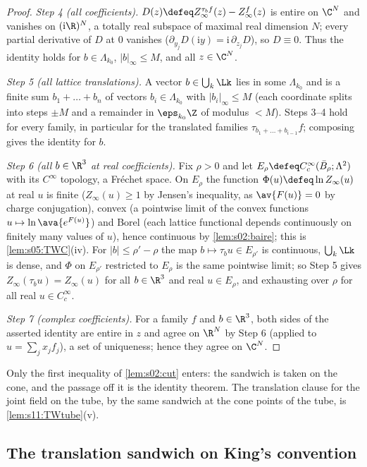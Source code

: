 \begin{proof}
\emph{Step 4 (all coefficients).} $D(z)\defeq Z^{\tau_bf}_\infty(z)-Z^f_\infty(z)$ is entire on $\C^N$ and vanishes on $(\mathrm i\R)^N$, a totally real subspace of maximal real dimension $N$; every partial derivative of $D$ at $0$ vanishes ($\partial_{y_j}D(\mathrm iy)=\mathrm i\,\partial_{z_j}D$), so $D\equiv0$. Thus the identity holds for $b\in\Lambda_{k_0}$, $|b|_\infty\le M$, and all $z\in\C^N$.

\emph{Step 5 (all lattice translations).} A vector $b\in\bigcup_k\Lk$ lies in some $\Lambda_{k_0}$ and is a finite sum $b_1+\dots+b_n$ of vectors $b_i\in\Lambda_{k_0}$ with $|b_i|_\infty\le M$ (each coordinate splits into steps $\pm M$ and a remainder in $\eps_{k_0}\Z$ of modulus $<M$). Steps 3--4 hold for every family, in particular for the translated families $\tau_{b_1+\dots+b_{i-1}}f$; composing gives the identity for $b$.

\emph{Step 6 (all $b\in\R^3$ at real coefficients).} Fix $\rho>0$ and let $E_\rho\defeq C^\infty_c(\bar B_\rho;\Lambda^2)$ with its $C^\infty$ topology, a Fr\'echet space. On $E_\rho$ the function $\Phi(u)\defeq\ln Z_\infty(u)$ at real $u$ is finite ($Z_\infty(u)\ge1$ by Jensen's inequality, as $\av{F(u)}=0$ by charge conjugation), convex (a pointwise limit of the convex functions $u\mapsto\ln\ava{e^{F(u)}}$) and Borel (each lattice functional depends continuously on finitely many values of $u$), hence continuous by \cref{lem:s02:baire}; this is \cref{lem:s05:TWC}(iv). For $|b|\le\rho'-\rho$ the map $b\mapsto\tau_bu\in E_{\rho'}$ is continuous, $\bigcup_k\Lk$ is dense, and $\Phi$ on $E_{\rho'}$ restricted to $E_\rho$ is the same pointwise limit; so Step 5 gives $Z_\infty(\tau_bu)=Z_\infty(u)$ for all $b\in\R^3$ and real $u\in E_\rho$, and exhausting over $\rho$ for all real $u\in C^\infty_c$.

\emph{Step 7 (complex coefficients).} For a family $f$ and $b\in\R^3$, both sides of the asserted identity are entire in $z$ and agree on $\R^N$ by Step 6 (applied to $u=\sum_jx_jf_j$), a set of uniqueness; hence they agree on $\C^N$.
\end{proof}

Only the first inequality of \cref{lem:s02:cut} enters: the sandwich is taken on the cone, and the passage off it is the identity theorem. The translation clause for the joint field on the tube, by the same sandwich at the cone points of the tube, is \cref{lem:s11:TWtube}(v).

\subsection{The translation sandwich on King's convention}

